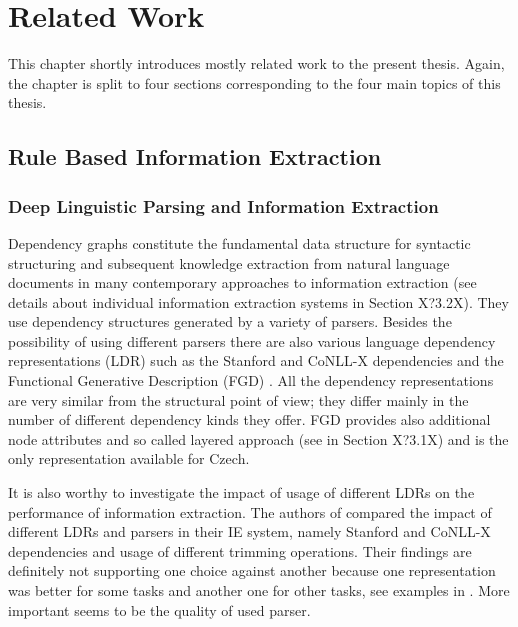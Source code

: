 \chapter{Related Work}

This chapter shortly introduces mostly related work to the present thesis. Again, the chapter is split to four sections corresponding to the four main topics of this thesis.



\section{Rule Based Information Extraction}

\subsection{Deep Linguistic Parsing and Information Extraction}

Dependency graphs constitute the fundamental data structure for syntactic structuring and subsequent knowledge extraction from natural language documents in many contemporary approaches to information extraction (see details about individual information extraction systems in Section X?3.2X). They use dependency structures generated by a variety of parsers. Besides the possibility of using different parsers there are also various language dependency representations (LDR) such as the Stanford \citep{stanfordDeps} and CoNLL-X \citep{johansson2007a} dependencies and the Functional Generative Description (FGD) \cite{SgallHajicovaPanevova1986}. All the dependency representations are very similar from the structural point of view; they differ mainly in the number of different dependency kinds they offer. FGD provides also additional node attributes and so called layered approach (see in Section X?3.1X) and is the only representation available for Czech.


It is also worthy to investigate the impact of usage of different LDRs on the performance of information extraction. The authors of \citep{Buyko:2010:EIA:1870658.1870754} compared the impact of different LDRs and parsers in their IE system, namely Stanford and CoNLL-X dependencies and usage of different trimming operations. Their findings are definitely not supporting one choice against another because one representation was better for some tasks and another one for other tasks, see examples in \citep{Buyko:2010:EIA:1870658.1870754}. More important seems to be the quality of used parser.




